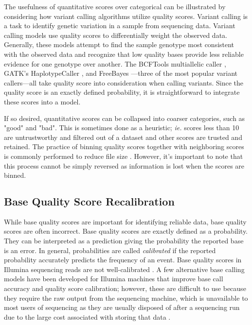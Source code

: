 The usefulness of quantitative scores over categorical can be illustrated by considering how variant calling algorithms utilize quality scores.
Variant calling is a task to identify genetic variation in a sample from sequencing data.
Variant calling models use quality scores to differentially weight the observed data. Generally, these models attempt to find the sample genotype most consistent with the observed data and recognize that low quality bases provide less reliable evidence for one genotype over another. The BCFTools multiallelic caller \parencite{li_sequence_2009}, GATK's HaplotypeCaller \parencite{poplin_scaling_2018}, and FreeBayes \parencite{garrison_haplotype-based_2012}---three of the most popular variant callers---all take quality score into consideration when calling variants.
Since the quality score is an exactly defined probability, it is straightforward to integrate these scores into a model.

If so desired, quantitative scores can be collapsed into coarser categories, such as "good" and "bad". This is sometimes done as a heuristic; \textit{ie.} scores less than 10 are untrustworthy and filtered out of a dataset and other scores are trusted and retained.
The practice of binning quality scores together with neighboring scores is commonly performed to reduce file size \parencite{shibuya_better_2019, malysa_qvz_2015, yu_quality_2015, noauthor_reducing_2014}. 
However, it's important to note that this process cannot be simply reversed as information is lost when the scores are binned.

\subsection{Base Quality Score Recalibration}

While base quality scores are important for identifying reliable data, base quality scores are often incorrect.
Base quality scores are exactly defined as a probability. They can be interpreted as a prediction giving the probability the reported base is an error. In general, probabilities are called \textit{calibrated} if the reported probability accurately predicts the frequency of an event.
Base quality scores in Illumina sequencing reads are not well-calibrated \parencite{callahan_dada2:_2016, ni_improvement_2016}. %
A few alternative base calling models have been developed for Illumina machines that improve base call accuracy and quality score calibration; however, these are difficult to use because they require the raw output from the sequencing machine, which is unavailable to most users of sequencing as they are usually disposed of after a sequencing run due to the large cost associated with storing that data \parencite{kao_naivebayescall_2011, massingham_all_2012}. 


